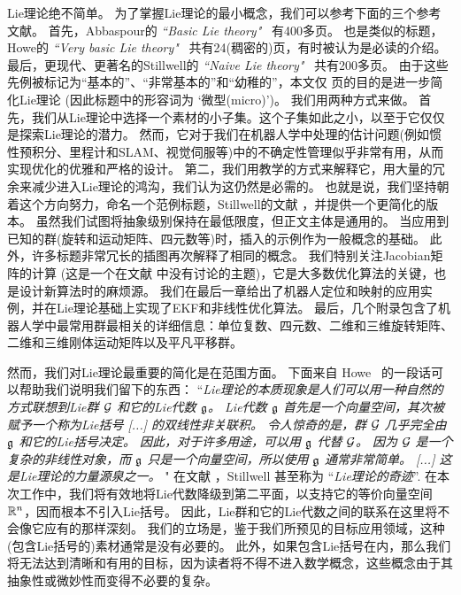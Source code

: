 Lie理论绝不简单。 
为了掌握Lie理论的最小概念，我们可以参考下面的三个参考文献。 
首先，Abbaspour的 \emph{``Basic Lie theory"}~\cite{ABBASPOUR-2007-Basic_Lie_theory} 有400多页。
也是类似的标题，Howe的 \emph{``Very basic Lie theory"}~\cite{Howe-Basic_Lie} 共有24(稠密的)页，有时被认为是必读的介绍。
最后，更现代、更著名的Stillwell的 \emph{``Naive Lie theory"}~\cite{STILLWELL-08} 共有200多页。
%
由于这些先例被标记为“基本的”、“非常基本的”和“幼稚的”，本文仅 \pageref{LastPage} 页的目的是进一步简化Lie理论 (因此标题中的形容词为 `微型(micro)')。
我们用两种方式来做。
首先，我们从Lie理论中选择一个素材的小子集。这个子集如此之小，以至于它仅仅是探索Lie理论的潜力。 
然而，它对于我们在机器人学中处理的估计问题(例如惯性预积分、里程计和SLAM、视觉伺服等)中的不确定性管理似乎非常有用，从而实现优化的优雅和严格的设计。
第二，我们用教学的方式来解释它，用大量的冗余来减少进入Lie理论的鸿沟，我们认为这仍然是必需的。
也就是说，我们坚持朝着这个方向努力，命名一个范例标题，Stillwell的文献 \cite{STILLWELL-08}，并提供一个更简化的版本。
虽然我们试图将抽象级别保持在最低限度，但正文主体是通用的。
当应用到已知的群(旋转和运动矩阵、四元数等)时，插入的示例作为一般概念的基础。 
此外，许多标题非常冗长的插图再次解释了相同的概念。
我们特别关注Jacobian矩阵的计算 (这是一个在文献 \cite{STILLWELL-08} 中没有讨论的主题)，它是大多数优化算法的关键，也是设计新算法时的麻烦源。
我们在最后一章给出了机器人定位和映射的应用实例，并在Lie理论基础上实现了EKF和非线性优化算法。
最后，几个附录包含了机器人学中最常用群最相关的详细信息：单位复数、四元数、二维和三维旋转矩阵、二维和三维刚体运动矩阵以及平凡平移群。


然而，我们对Lie理论最重要的简化是在范围方面。 
下面来自 
Howe~\cite{Howe-Basic_Lie} 的一段话可以帮助我们说明我们留下的东西：
%
``\emph{Lie理论的本质现象是人们可以用一种自然的方式联想到Lie群 $\mathcal{G}$ 和它的Lie代数 $\frak{g}$。
Lie代数 $\frak{g}$ 首先是一个向量空间，其次被赋予一个称为Lie括号 [...] 的双线性非关联积。 
令人惊奇的是，群 $\mathcal{G}$ 几乎完全由 $\frak{g}$ 和它的Lie括号决定。
因此，对于许多用途，可以用 $\frak{g}$ 代替 $\mathcal{G}$。
因为 $\mathcal{G}$ 是一个复杂的非线性对象，而 $\frak{g}$ 只是一个向量空间，所以使用 $\frak{g}$ 通常非常简单。
[...] 
这是Lie理论的力量源泉之一。%
}"
%
在文献 \cite{STILLWELL-08}，Stillwell 甚至称为 ``\emph{Lie理论的奇迹}''.
在本次工作中，我们将有效地将Lie代数降级到第二平面，以支持它的等价向量空间 ${\mathbb R}^n$，因而根本不引入Lie括号。
因此，Lie群和它的Lie代数之间的联系在这里将不会像它应有的那样深刻。
我们的立场是，鉴于我们所预见的目标应用领域，这种(包含Lie括号的)素材通常是没有必要的。
此外，如果包含Lie括号在内，那么我们将无法达到清晰和有用的目标，因为读者将不得不进入数学概念，这些概念由于其抽象性或微妙性而变得不必要的复杂。



